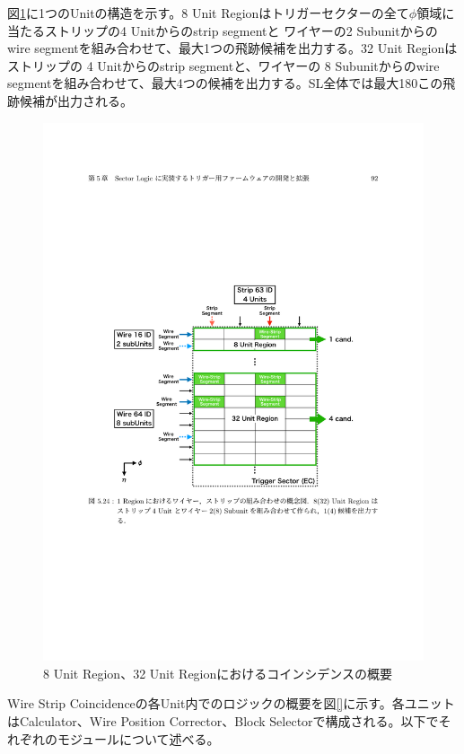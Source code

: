 図\ref{WS_Concept}に1つのUnitの構造を示す。8 Unit Regionはトリガーセクターの全て$\phi$領域に当たるストリップの4 Unitからのstrip segmentと ワイヤーの2 Subunitからのwire segmentを組み合わせて、最大1つの飛跡候補を出力する。32 Unit Regionはストリップの 4 Unitからのstrip segmentと、ワイヤーの 8 Subunitからのwire segmentを組み合わせて、最大4つの候補を出力する。SL全体では最大180この飛跡候補が出力される。

\begin{figure} 
\centering
\includegraphics[width=16cm]{fig/SL/WS_Concept.pdf}
\caption[]{8 Unit Region、32 Unit Regionにおけるコインシデンスの概要\cite{mt_kawamoto}}
\label{WS_Concept}
\end{figure}

Wire Strip Coincidenceの各Unit内でのロジックの概要を図\ref{}に示す。各ユニットは\pt Calculator、Wire Position Corrector、Block Selectorで構成される。以下でそれぞれのモジュールについて述べる。

